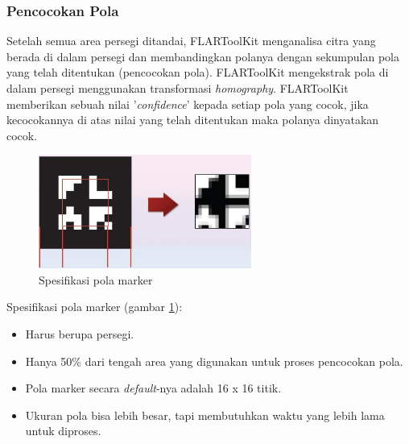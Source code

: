 \subsubsection {Pencocokan Pola}
\label{subsubsec:pattern_matching}
Setelah semua area persegi ditandai, FLARToolKit menganalisa citra yang berada di dalam persegi dan membandingkan polanya dengan sekumpulan pola yang telah ditentukan (pencocokan pola). FLARToolKit mengekstrak pola di dalam persegi menggunakan transformasi \textit{homography}. FLARToolKit memberikan sebuah nilai '\textit{confidence}' kepada setiap pola yang cocok, jika kecocokannya di atas nilai yang telah ditentukan maka polanya dinyatakan cocok. 

\begin{figure}
\begin{center}
\includegraphics[width=7cm]{./images/flartk/marker_spec.JPG}
\caption{\label{fig:marker_spec} Spesifikasi pola marker}
\end{center}
\end{figure} 

Spesifikasi pola marker (gambar \ref{fig:marker_spec}):
\begin{itemize}
	\item Harus berupa persegi.
	\item Hanya 50\% dari tengah area yang digunakan untuk proses pencocokan pola.
	\item Pola marker secara \textit{default}-nya adalah 16 x 16 titik.
	\item Ukuran pola bisa lebih besar, tapi membutuhkan waktu yang lebih lama untuk diproses.
\end{itemize}


